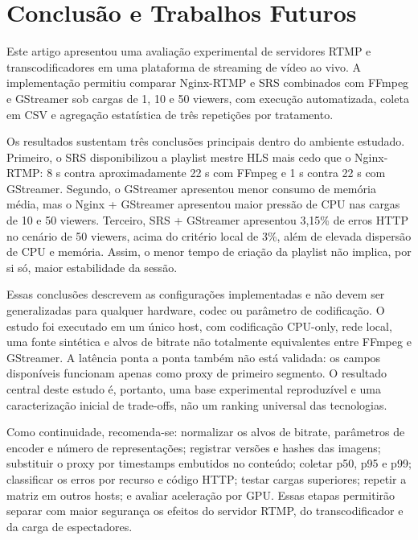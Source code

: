 \section{Conclusão e Trabalhos Futuros}

Este artigo apresentou uma avaliação experimental de servidores RTMP e transcodificadores em uma plataforma de streaming de vídeo ao vivo. A implementação permitiu comparar Nginx-RTMP e SRS combinados com FFmpeg e GStreamer sob cargas de 1, 10 e 50 viewers, com execução automatizada, coleta em CSV e agregação estatística de três repetições por tratamento.

Os resultados sustentam três conclusões principais dentro do ambiente estudado. Primeiro, o SRS disponibilizou a playlist mestre HLS mais cedo que o Nginx-RTMP: 8 s contra aproximadamente 22 s com FFmpeg e 1 s contra 22 s com GStreamer. Segundo, o GStreamer apresentou menor consumo de memória média, mas o Nginx + GStreamer apresentou maior pressão de CPU nas cargas de 10 e 50 viewers. Terceiro, SRS + GStreamer apresentou 3,15\% de erros HTTP no cenário de 50 viewers, acima do critério local de 3\%, além de elevada dispersão de CPU e memória. Assim, o menor tempo de criação da playlist não implica, por si só, maior estabilidade da sessão.

Essas conclusões descrevem as configurações implementadas e não devem ser generalizadas para qualquer hardware, codec ou parâmetro de codificação. O estudo foi executado em um único host, com codificação CPU-only, rede local, uma fonte sintética e alvos de bitrate não totalmente equivalentes entre FFmpeg e GStreamer. A latência ponta a ponta também não está validada: os campos disponíveis funcionam apenas como proxy de primeiro segmento. O resultado central deste estudo é, portanto, uma base experimental reproduzível e uma caracterização inicial de trade-offs, não um ranking universal das tecnologias.

Como continuidade, recomenda-se: normalizar os alvos de bitrate, parâmetros de encoder e número de representações; registrar versões e hashes das imagens; substituir o proxy por timestamps embutidos no conteúdo; coletar p50, p95 e p99; classificar os erros por recurso e código HTTP; testar cargas superiores; repetir a matriz em outros hosts; e avaliar aceleração por GPU. Essas etapas permitirão separar com maior segurança os efeitos do servidor RTMP, do transcodificador e da carga de espectadores.
